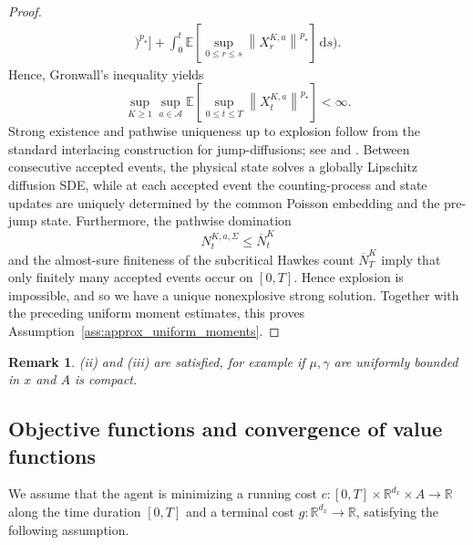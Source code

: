 \documentclass[11pt]{article}
\theoremstyle{remarkitalic}
\theoremstyle{remarkitalic}
\newtheorem{remark}[theorem]{Remark}
\newcommand{\E}{\mathbb E}
\newcommand{\dd}{\,\mathrm d}
\newcommand{\1}{\mathbf 1}
\newcommand{\norm}[1]{\left\lVert #1 \right\rVert}
\begin{document}
\begin{proof}
\[\begin{aligned}
    )^{p_\star}\bigr]
    +
    \int_0^t
    \E\left[
        \sup_{0\leq r\leq s}
        \norm{X_r^{K,a}}^{p_\star}
    \right]\dd s
\Bigg).
\end{aligned}
\]
Hence, Gronwall's inequality yields
\[
    \sup_{K\geq1}\sup_{a\in\mathcal A}
    \E\left[
        \sup_{0\leq t\leq T}
        \norm{X_t^{K,a}}^{p_\star}
    \right]
    <\infty.
\] Strong existence and pathwise uniqueness up to explosion follow from
the standard interlacing construction for jump-diffusions; see
\cite[Chapter~V.10, Theorem~57]{protter2005stochastic} and
\cite[Proposition~2.1]{banos2024hestonhawkes}. Between consecutive
accepted events, the physical state solves a globally Lipschitz
diffusion SDE, while at each accepted event the counting-process and
state updates are uniquely determined by the common Poisson
embedding and the pre-jump state. Furthermore, the pathwise
domination
\[
    N_t^{K,a,\Sigma}\leq\overline N_t^K
\]
and the almost-sure finiteness of the subcritical Hawkes count
$\overline N_T^K$ imply that only finitely many accepted events occur
on $[0,T]$. Hence explosion is impossible, and so we have a unique nonexplosive strong solution.
Together with the preceding uniform moment estimates, this proves
Assumption~\ref{ass:approx_uniform_moments}.
\end{proof}

\begin{remark}
    (ii) and (iii) are satisfied, for example if $\mu,\gamma$ are uniformly bounded in $x$ and $A$ is compact.
\end{remark}

\subsection{Objective functions and convergence of value functions}
We assume that the agent is minimizing a running cost $c:[0,T]\times \mathbb R^{d_x}\times A\longrightarrow \mathbb R$ along the time duration $[0,T]$ and a terminal cost $g:\mathbb R^{d_x} \longrightarrow\mathbb R$, satisfying the following assumption.  
\end{document}

